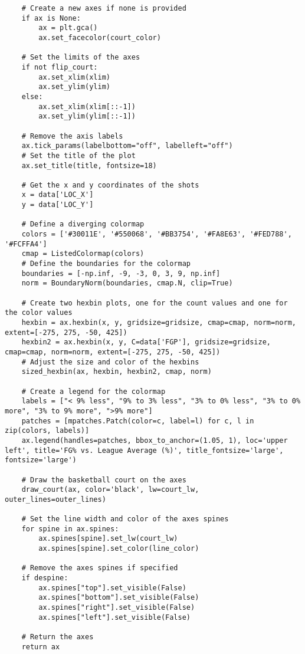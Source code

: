 \begin{verbatim}
    # Create a new axes if none is provided
    if ax is None:
        ax = plt.gca()
        ax.set_facecolor(court_color)

    # Set the limits of the axes
    if not flip_court:
        ax.set_xlim(xlim)
        ax.set_ylim(ylim)
    else:
        ax.set_xlim(xlim[::-1])
        ax.set_ylim(ylim[::-1])

    # Remove the axis labels
    ax.tick_params(labelbottom="off", labelleft="off")
    # Set the title of the plot
    ax.set_title(title, fontsize=18)

    # Get the x and y coordinates of the shots
    x = data['LOC_X']
    y = data['LOC_Y']
        
    # Define a diverging colormap
    colors = ['#30011E', '#550068', '#BB3754', '#FA8E63', '#FED788', '#FCFFA4']
    cmap = ListedColormap(colors)
    # Define the boundaries for the colormap
    boundaries = [-np.inf, -9, -3, 0, 3, 9, np.inf]
    norm = BoundaryNorm(boundaries, cmap.N, clip=True)   
    
    # Create two hexbin plots, one for the count values and one for the color values
    hexbin = ax.hexbin(x, y, gridsize=gridsize, cmap=cmap, norm=norm, extent=[-275, 275, -50, 425])
    hexbin2 = ax.hexbin(x, y, C=data['FGP'], gridsize=gridsize, cmap=cmap, norm=norm, extent=[-275, 275, -50, 425])
    # Adjust the size and color of the hexbins
    sized_hexbin(ax, hexbin, hexbin2, cmap, norm)

    # Create a legend for the colormap
    labels = ["< 9% less", "9% to 3% less", "3% to 0% less", "3% to 0% more", "3% to 9% more", ">9% more"]
    patches = [mpatches.Patch(color=c, label=l) for c, l in zip(colors, labels)]
    ax.legend(handles=patches, bbox_to_anchor=(1.05, 1), loc='upper left', title='FG% vs. League Average (%)', title_fontsize='large', fontsize='large')

    # Draw the basketball court on the axes
    draw_court(ax, color='black', lw=court_lw, outer_lines=outer_lines)

    # Set the line width and color of the axes spines
    for spine in ax.spines:
        ax.spines[spine].set_lw(court_lw)
        ax.spines[spine].set_color(line_color)

    # Remove the axes spines if specified
    if despine:
        ax.spines["top"].set_visible(False)
        ax.spines["bottom"].set_visible(False)
        ax.spines["right"].set_visible(False)
        ax.spines["left"].set_visible(False)

    # Return the axes
    return ax
\end{verbatim}

